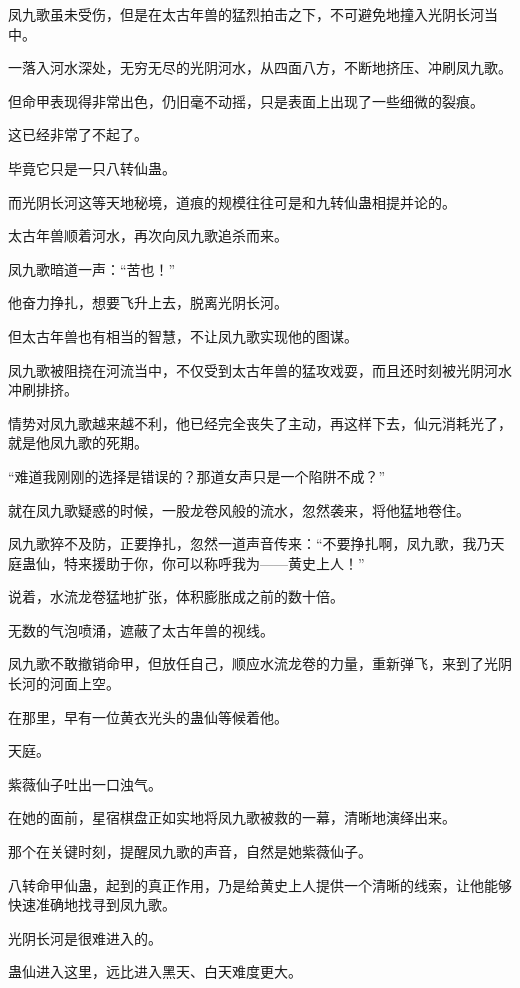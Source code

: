\begin{this_body}
凤九歌虽未受伤，但是在太古年兽的猛烈拍击之下，不可避免地撞入光阴长河当中。

一落入河水深处，无穷无尽的光阴河水，从四面八方，不断地挤压、冲刷凤九歌。

但命甲表现得非常出色，仍旧毫不动摇，只是表面上出现了一些细微的裂痕。

这已经非常了不起了。

毕竟它只是一只八转仙蛊。

而光阴长河这等天地秘境，道痕的规模往往可是和九转仙蛊相提并论的。

太古年兽顺着河水，再次向凤九歌追杀而来。

凤九歌暗道一声：“苦也！”

他奋力挣扎，想要飞升上去，脱离光阴长河。

但太古年兽也有相当的智慧，不让凤九歌实现他的图谋。

凤九歌被阻挠在河流当中，不仅受到太古年兽的猛攻戏耍，而且还时刻被光阴河水冲刷排挤。

情势对凤九歌越来越不利，他已经完全丧失了主动，再这样下去，仙元消耗光了，就是他凤九歌的死期。

“难道我刚刚的选择是错误的？那道女声只是一个陷阱不成？”

就在凤九歌疑惑的时候，一股龙卷风般的流水，忽然袭来，将他猛地卷住。

凤九歌猝不及防，正要挣扎，忽然一道声音传来：“不要挣扎啊，凤九歌，我乃天庭蛊仙，特来援助于你，你可以称呼我为——黄史上人！”

说着，水流龙卷猛地扩张，体积膨胀成之前的数十倍。

无数的气泡喷涌，遮蔽了太古年兽的视线。

凤九歌不敢撤销命甲，但放任自己，顺应水流龙卷的力量，重新弹飞，来到了光阴长河的河面上空。

在那里，早有一位黄衣光头的蛊仙等候着他。

天庭。

紫薇仙子吐出一口浊气。

在她的面前，星宿棋盘正如实地将凤九歌被救的一幕，清晰地演绎出来。

那个在关键时刻，提醒凤九歌的声音，自然是她紫薇仙子。

八转命甲仙蛊，起到的真正作用，乃是给黄史上人提供一个清晰的线索，让他能够快速准确地找寻到凤九歌。

光阴长河是很难进入的。

蛊仙进入这里，远比进入黑天、白天难度更大。


\end{this_body}
